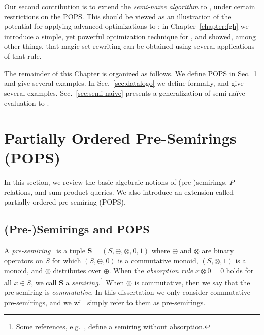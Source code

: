 
Our second contribution is to extend the {\em semi-na\"ive algorithm} 
to \datalogo, under certain restrictions on the POPS.  This
should be viewed as an illustration of the potential for applying
advanced optimizations to \datalogo: in Chapter~\ref{chapter:fgh}
we introduce a simple, yet
powerful optimization technique for \datalogo, and showed, among other
things, that magic set rewriting can be obtained using several
applications of that rule.

The remainder of this Chapter is organized as follows. 
We define POPS in Sec.~\ref{sec:pops} and give several examples.
In Sec.~\ref{sec:datalogo} we define \datalogo formally, 
 and give several examples.
Sec.~\ref{sec:semi-naive} presents a generalization of semi-na\"ive
evaluation to \datalogo.  

\section{Partially Ordered Pre-Semirings (POPS)}
\label{sec:pops}

In this section, we review the basic algebraic notions of (pre-)semirings,
$P$-relations, and sum-product queries.
We also introduce an extension called partially ordered pre-semiring (POPS).

\subsection{(Pre-)Semirings and POPS}

\begin{defn}
A {\em pre-semiring}~\cite{semiring_book} is a tuple
$\bm S = (S, \oplus, \otimes, 0, 1)$ where $\oplus$ and $\otimes$ are
binary operators on $S$ for which $(S, \oplus, 0)$ is a commutative
monoid, $(S, \otimes, 1)$ is a monoid, and $\otimes$ distributes over
$\oplus$.
When the {\em absorption rule} $x \otimes 0 = 0$ holds
for all $x \in S$, we call $\bm S$ a {\em semiring}.\footnote{Some
  references, e.g.~\cite{DBLP:journals/ai/KohlasW08}, define a
  semiring without absorption.}
%
When $\otimes$ is commutative, then we say that the
pre-semiring is {\em commutative}.  In this dissertation we only consider
commutative pre-semirings, and we will simply refer to them as
pre-semirings.
\end{defn}

